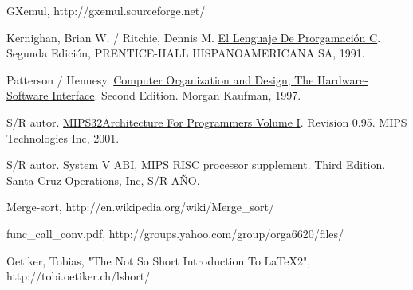 \documentclass[a4paper,10pt]{article}
\begin{document}
\begin{thebibliography}{99}

 GXemul, http://gxemul.sourceforge.net/

 Kernighan, Brian W. / Ritchie, Dennis M. \underline{El Lenguaje De Prorgamaci\'on C}. Segunda Edici\'on, PRENTICE-HALL HISPANOAMERICANA SA, 1991.

 Patterson / Hennesy. \underline{Computer Organization and Design; The Hardware-Software Interface}. Second Edition. Morgan Kaufman, 1997.

 S/R autor. \underline{MIPS32\texttrademark Architecture For Programmers Volume I}. Revision 0.95. MIPS Technologies Inc, 2001.

 S/R autor. \underline{System V ABI, MIPS RISC processor supplement}. Third Edition. Santa Cruz Operations, Inc, S/R A\~NO.

 Merge-sort, http://en.wikipedia.org/wiki/Merge\_sort/

 func\_call\_conv.pdf, http://groups.yahoo.com/group/orga6620/files/

 Oetiker, Tobias, "The Not So Short Introduction To LaTeX2", http://tobi.oetiker.ch/lshort/

\end{thebibliography}
\end{document}
